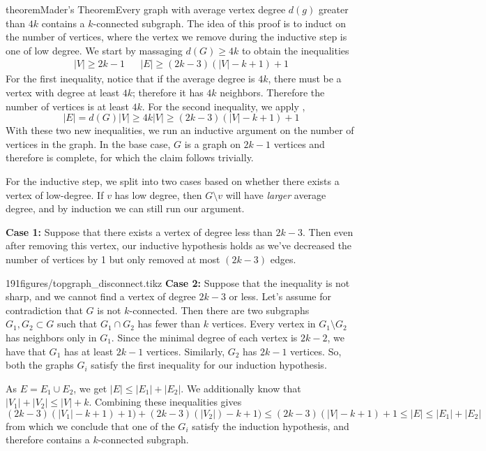 
\begin{framedpage}{theorem}{Mader's Theorem}{Every graph with average vertex degree $d(g)$ greater than $4k$ contains a $k$-connected subgraph. \label{graph:thm:mader}}
	The idea of this proof is to induct on the number of vertices, where the vertex we remove during the inductive step is one of low degree. We start by massaging $d(G)\geq 4k$ to obtain the inequalities
	\begin{align*}|V|\geq 2k-1 && |E|\geq (2k-3)(|V|-k+1)+1\end{align*}
	For the first inequality, notice that if the average degree is $4k$, there must be a vertex with degree at least $4k$; therefore it has $4k$ neighbors. Therefore the number of vertices is at least $4k$. 
	For the second inequality, we apply ,
	\[|E|= d(G)|V| \geq  4k  |V| 
	\geq(2k-3)(|V|-k+1)+1\]
	With these two new inequalities, we run an inductive argument on the number of vertices in the graph. In the base case, $G$ is a graph on $2k-1$ vertices and therefore is complete, for which the claim follows trivially.

    For the inductive step, we split into two cases based on whether there exists a vertex of low-degree. If $v$ has low degree, then $G\setminus v$ will have \emph{larger}  average degree, and by induction we can still run our argument. 
    
	\textbf{Case 1:} Suppose that there exists a vertex of degree less than $2k-3$. Then even after removing this vertex, our inductive hypothesis holds as we've decreased the number of vertices by 1 but only removed at most $(2k-3)$ edges.
\begin{paragraphfigureenv}[]{191figures/topgraph_disconnect.tikz} 
	\textbf{Case 2:} Suppose that the inequality is not sharp,  and we cannot find a vertex of degree $2k-3$ or less. Let's assume for contradiction that $G$ is not $k$-connected. Then there are two subgraphs $G_1,  G_2\subset G$ such that $G_1\cap G_2$ has fewer than $k$ vertices. 
	Every vertex in $G_1\setminus G_2$ has neighbors only in $G_1$. Since the minimal degree of each vertex is $2k-2$,  we have that $G_1$ has at least $2k-1$ vertices. Similarly,  $G_2$ has $2k-1$ vertices. So, both the graphs $G_i$ satisfy the first inequality for our induction hypothesis.
	\end{paragraphfigureenv} As $E=E_1\cup E_2$, we get $|E|\leq |E_1|+|E_2|$. We additionally know that $|V_1|+|V_2|\leq |V|+k$. Combining these inequalities gives
	\[(2k-3)(|V_1|-k+1)+1)+(2k-3)(|V_2|)-k+1)\leq (2k-3)(|V|-k+1)+1\leq |E|\leq |E_1|+|E_2|\]
	from which we conclude that one of the $G_i$ satisfy the induction hypothesis, and therefore contains a $k$-connected subgraph. 
\end{framedpage}